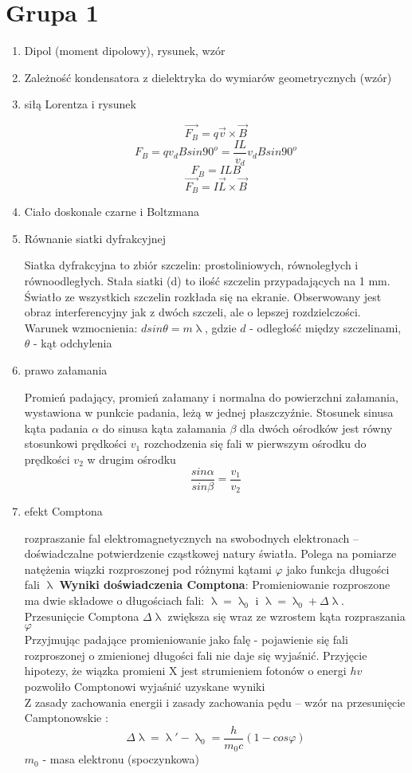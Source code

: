 \documentclass[12pt,a4paper]{article}
\begin{document}
\section{Grupa 1}
\begin {enumerate}


\item Dipol (moment dipolowy), rysunek, wzór

\item Zależność kondensatora z dielektryka do wymiarów geometrycznych (wzór)

\item siłą Lorentza i rysunek

 $$\vec{F_B}=q\vec{v}\times\vec{B}$$
 $$F_B = qv_dBsin90^o=\frac{IL}{v_d}v_dBsin90^o$$
 $$F_B=ILB$$
 $$\vec{F_B}=I\vec{L}\times\vec{B}$$

\item Ciało doskonale czarne i Boltzmana

\item Równanie siatki dyfrakcyjnej

Siatka dyfrakcyjna to zbiór szczelin: prostoliniowych, równoległych i równoodległych. Stała siatki (d) to ilość szczelin przypadających na 1 mm. Światło ze wszystkich szczelin rozkłada się na ekranie. Obserwowany jest obraz interferencyjny jak z dwóch szczeli, ale o lepszej rozdzielczości.\\
Warunek wzmocnienia: $dsin\theta =m\uplambda$, gdzie $d$ - odległość między szczelinami, $\theta$ - kąt odchylenia

\item prawo załamania

Promień padający, promień załamany i normalna do powierzchni załamania, wystawiona w punkcie padania, leżą w jednej płaszczyźnie. Stosunek sinusa kąta padania $\alpha$ do sinusa kąta załamania $\beta$ dla dwóch ośrodków jest równy stosunkowi prędkości $v_1$ rozchodzenia się fali w pierwszym ośrodku do prędkości $v_2$ w drugim ośrodku
$$\frac{sin\alpha}{sin\beta}=\frac{v_1}{v_2}$$

\item efekt Comptona

rozpraszanie fal elektromagnetycznych na swobodnych elektronach -- doświadczalne potwierdzenie cząstkowej natury światła. Polega na pomiarze natężenia wiązki rozproszonej pod różnymi kątami $\varphi$ jako funkcja długości fali $\uplambda$
\textbf{Wyniki doświadczenia Comptona}: Promieniowanie rozproszone ma dwie składowe o długościach fali: $\uplambda = \uplambda_0$ i $\uplambda = \uplambda_0 +\Delta\uplambda$. Przesunięcie Comptona $\Delta\uplambda$ zwiększa się wraz ze wzrostem kąta rozpraszania $\varphi$\\
Przyjmując padające promieniowanie jako falę - pojawienie się fali rozproszonej o zmienionej długości fali nie daje się wyjaśnić. Przyjęcie hipotezy, że wiązka promieni X jest strumieniem fotonów o energi $hv$ pozwoliło Comptonowi wyjaśnić uzyskane wyniki\\
Z zasady zachowania energii i zasady zachowania pędu -- wzór na przesunięcie Camptonowskie :
$$\Delta\uplambda = \uplambda' -\uplambda_0 = \frac{h}{m_0c}\left(1-cos\varphi\right)$$
$m_0$ - masa elektronu (spoczynkowa)


\end{enumerate}
\end{document}
